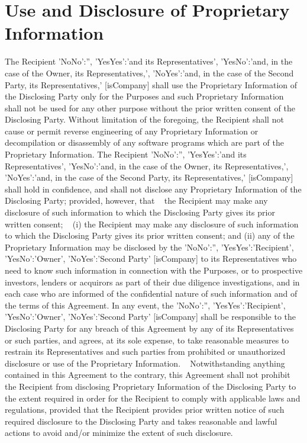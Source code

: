 \documentclass[12pt]{article}
\newcommand{\VAR}[1]{{\color{blue}#1}}
\newcommand{\BLOCK}[1]{~\newline{ \color{red}#1 }}
\newcommand{\representativesMention}[1]{
    \VAR{
        {
            'NoNo':'',
            'YesYes':'#1 its Representatives',
            'YesNo':'#1, in the case of the Owner, its Representatives,',
            'NoYes':'#1, in the case of the Second Party, its Representatives,'
        }[isCompany]
    }
}
\newcommand{\representedParty}{
    \VAR{
        {
            'NoNo':'',
            'YesYes':'Recipient',
            'YesNo':'Owner',
            'NoYes':'Second Party'
        }[isCompany]
    }
}
\begin{document}
\section{Use and Disclosure of Proprietary Information} \label{sec:discl}
The Recipient \representativesMention{and} shall use the Proprietary Information of the Disclosing Party only for the Purposes and such Proprietary Information shall not be used for any other purpose without the prior written consent of the Disclosing Party. Without limitation of the foregoing, the Recipient shall not cause or permit reverse engineering of any Proprietary Information or decompilation or disassembly of any software programs which are part of the Proprietary Information.
The Recipient \representativesMention{and} shall hold in confidence, and shall not disclose any Proprietary Information of the Disclosing Party; provided, however, that
\BLOCK{ if isCompany == 'NoNo' }
the Recipient may make any disclosure of such information to which the Disclosing Party gives its prior written consent;
\BLOCK{ else }
(i) the Recipient may make any disclosure of such information to which the Disclosing Party gives its prior written consent; and (ii) any of the Proprietary Information may be disclosed by the \representedParty to its Representatives who need to know such information in connection with the Purposes, or to prospective investors, lenders or acquirors as part of their due diligence investigations, and in each case who are informed of the confidential nature of such information and of the terms of this Agreement. In any event, the \representedParty shall be responsible to the Disclosing Party for any breach of this Agreement by any of its Representatives or such parties, and agrees, at its sole expense, to take reasonable measures to restrain its Representatives and such parties from prohibited or unauthorized disclosure or use of the Proprietary Information.
\BLOCK{ endif }
Notwithstanding anything contained in this Agreement to the contrary, this Agreement shall not prohibit the Recipient from disclosing Proprietary Information of the Disclosing Party to the extent required in order for the Recipient to comply with applicable laws and regulations, provided that the Recipient provides prior written notice of such required disclosure to the Disclosing Party and takes reasonable and lawful actions to avoid and/or minimize the extent of such disclosure.
\end{document}
